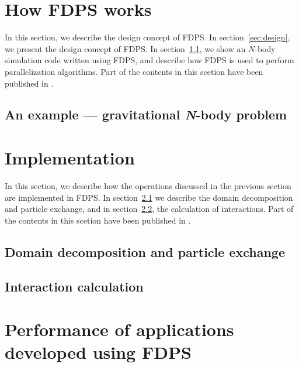 \documentclass[proof]{pasj01}
\begin{document}
\section{How FDPS works}
\label{sec:user}

In this section, we describe the design concept of FDPS. In
section~\ref{sec:design}, we present the design concept of FDPS. In
section~\ref{sec:samplecode}, we show an $N$-body simulation code
written using FDPS, and describe how FDPS is used to perform
parallelization algorithms. Part of the contents in this scetion have been
published in \citet{2015FDPS}.



\subsection{An example --- gravitational \textit{N}-body problem}
\label{sec:samplecode}



\section{Implementation}
\label{sec:implementation}

In this section, we describe how the operations discussed in the
previous section are implemented in FDPS. In
section~\ref{sec:decomposition} we describe the domain decomposition
and particle exchange, and in section~\ref{sec:calculation}, the
calculation of interactions. Part of the contents in this scetion have
been published in \citet{2015FDPS}.

\subsection{Domain decomposition and particle exchange}
\label{sec:decomposition}



\subsection{Interaction calculation}
\label{sec:calculation}



\section{Performance of applications developed using FDPS}
\label{sec:performance}
\end{document}
